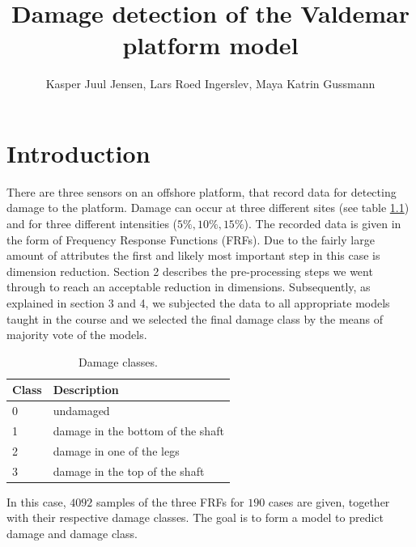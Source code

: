 \documentclass[a4paper,draft=false]{scrreprt}\usepackage[]{graphicx}\usepackage[]{color}
\title{Damage detection of the Valdemar platform model}
\author{Kasper Juul Jensen, Lars Roed Ingerslev, Maya Katrin Gussmann}
\begin{document}
\maketitle



\chapter{Introduction} %

There are three sensors on an offshore platform, that record data for detecting damage to the platform. Damage can occur at three different sites (see table \ref{table:damageclass}) and for three different intensities ($5\%, 10\%, 15\%$). The recorded data is given in the form of Frequency Response Functions (FRFs).
Due to the fairly large amount of attributes the first and likely most important step in this case is dimension reduction. Section 2 describes the pre-processing steps we went through to reach an acceptable reduction in dimensions. Subsequently, as explained in section 3 and 4, we subjected the data to all appropriate models taught in the course and we selected the final damage class by the means of majority vote of the models.   

\begin{table}[ht]
\begin{center}
\begin{tabular}{ll}
  \hline
  Class & Description\\\hline
  0 & undamaged\\
  1 & damage in the bottom of the shaft\\
  2 & damage in one of the legs\\
  3 & damage in the top of the shaft\\
  \hline
\end{tabular}
\caption{Damage classes.\label{table:damageclass}}
\end{center}
\end{table}

In this case, $4092$ samples of the three FRFs for $190$ cases are given, together with their respective damage classes. The goal is to form a model to predict damage and damage class.
\end{document}

